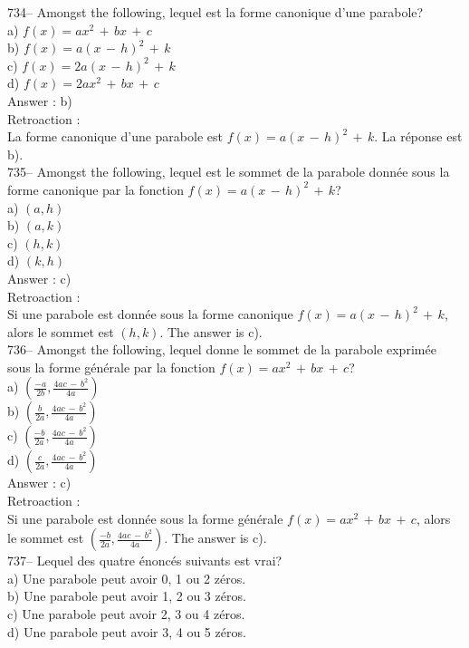 ﻿\documentclass[letterpaper, 12pt]{article}
\begin{document}
734-- Amongst the following, lequel est la forme canonique d'une
parabole?\\
a) $f(x)=ax^{2}\,+\,bx\,+\,c$\\
b) $f(x)=a(x\,-\,h)^{2}\,+\,k$\\
c) $f(x)=2a(x\,-\,h)^{2}\,+\,k$\\
d) $f(x)=2ax^{2}\,+\,bx\,+\,c$\\

Answer : b)\\

Retroaction : \\
La forme canonique d'une parabole est $f(x)=a(x\,-\,h)^{2}\,+\,k$.  La
r\'eponse est b).\\

735-- Amongst the following, lequel est le sommet de la parabole
donn\'ee sous la forme canonique par la fonction
$f(x)=a(x\,-\,h)^{2}\,+\,k$?\\
a) $(a,h)$\\
b) $(a,k)$\\
c) $(h,k)$\\
d) $(k,h)$\\

Answer : c)\\

Retroaction : \\
Si une parabole est donn\'ee sous la forme canonique
$f(x)=a(x\,-\,h)^{2}\,+\,k$, alors le sommet est $(h,k)$.  The answer is
c).\\

736-- Amongst the following, lequel donne le sommet de la parabole
exprim\'ee sous la forme g\'en\'erale par la fonction
$f(x)=ax^{2}\,+\,bx\,+\,c$?\\
a) $(\frac{-a}{2b},\frac{4ac\,-\,b^{2}}{4a})$\\[2mm]
b) $(\frac{b}{2a},\frac{4ac\,-\,b^{2}}{4a})$\\[2mm]
c) $(\frac{-b}{2a},\frac{4ac\,-\,b^{2}}{4a})$\\[2mm]
d) $(\frac{c}{2a},\frac{4ac\,-\,b^{2}}{4a})$\\

Answer : c)\\

Retroaction : \\
Si une parabole est donn\'ee sous la forme g\'en\'erale
$f(x)=ax^{2}\,+\,bx\,+\,c$, alors le sommet est
$(\frac{-b}{2a},\frac{4ac\,-\,b^{2}}{4a})$.  The answer is c).\\

737-- Lequel des quatre \'enonc\'es suivants est vrai?\\
a) Une parabole peut avoir 0, 1 ou 2 z\'eros.\\
b) Une parabole peut avoir 1, 2 ou 3 z\'eros.\\
c) Une parabole peut avoir 2, 3 ou 4 z\'eros.\\
d) Une parabole peut avoir 3, 4 ou 5 z\'eros.\\
\end{document}
